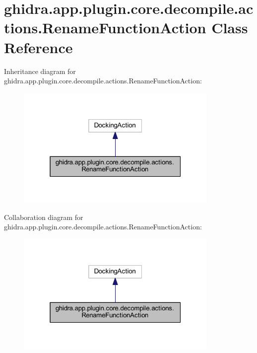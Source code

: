 \hypertarget{classghidra_1_1app_1_1plugin_1_1core_1_1decompile_1_1actions_1_1_rename_function_action}{}\section{ghidra.\+app.\+plugin.\+core.\+decompile.\+actions.\+Rename\+Function\+Action Class Reference}
\label{classghidra_1_1app_1_1plugin_1_1core_1_1decompile_1_1actions_1_1_rename_function_action}


Inheritance diagram for ghidra.\+app.\+plugin.\+core.\+decompile.\+actions.\+Rename\+Function\+Action\+:
\nopagebreak
\begin{figure}[H]
\begin{center}
\leavevmode
\includegraphics[width=277pt]{classghidra_1_1app_1_1plugin_1_1core_1_1decompile_1_1actions_1_1_rename_function_action__inherit__graph}
\end{center}
\end{figure}


Collaboration diagram for ghidra.\+app.\+plugin.\+core.\+decompile.\+actions.\+Rename\+Function\+Action\+:
\nopagebreak
\begin{figure}[H]
\begin{center}
\leavevmode
\includegraphics[width=277pt]{classghidra_1_1app_1_1plugin_1_1core_1_1decompile_1_1actions_1_1_rename_function_action__coll__graph}
\end{center}
\end{figure}
